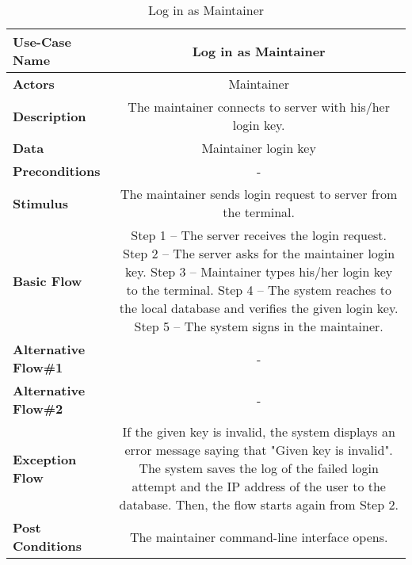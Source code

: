 \begin{table}[H]
     \centering
     \begin{tabular}{|l|C|}
         \hline
          \textbf{Use-Case Name} & Log in as Maintainer \\
         \hline
          \textbf{Actors} & Maintainer \\ 
         \hline
          \textbf{Description} & The maintainer connects to server with his/her login key.\\ 
         \hline
          \textbf{Data} & Maintainer login key\\ 
         \hline
          \textbf{Preconditions} & - \\
         \hline
          \textbf{Stimulus} & The maintainer sends login request to server from the terminal.\\ 
         \hline
          \textbf{Basic Flow} & 
          Step 1 -- The server receives the login request. \newline
          Step 2 -- The server asks for the maintainer login key. \newline
          Step 3 -- Maintainer types his/her login key to the terminal. \newline
          Step 4 -- The system reaches to the local database and verifies the given login key.   \newline
          Step 5 -- The system signs in the maintainer. \\
         \hline
          \textbf{Alternative Flow\#1} & - \\
         \hline
          \textbf{Alternative Flow\#2} & - \\
         \hline
          \textbf{Exception Flow} & If the given key is invalid, the system displays an error message saying that "Given key is invalid". The system saves the log of the failed login attempt and the IP address of the user to the database. Then, the flow starts again from Step 2. \\
         \hline
          \textbf{Post Conditions} & The maintainer command-line interface opens. \\ 
         \hline
     \end{tabular}
     \caption{Log in as Maintainer}
     \label{tab:log_in_as_maintainer}
 \end{table}